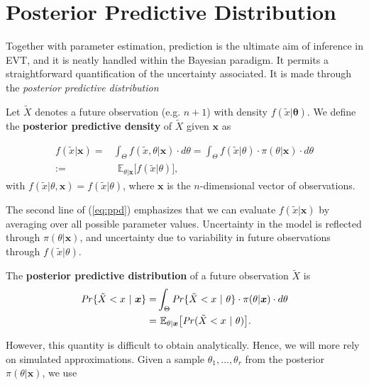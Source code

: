 \section{Posterior Predictive Distribution}\label{sec:ppd}

Together with parameter estimation, prediction is the ultimate aim of inference in EVT, and it is neatly handled within the Bayesian paradigm. It permits a straightforward quantification of the uncertainty associated. It is made through the \emph{posterior predictive distribution}

\begin{definition}
	Let $\tilde{X}$ denotes a future observation (e.g. $n+1$) with density $f(\tilde{x}|\boldsymbol{\theta})$. We define the \textbf{posterior predictive density} of $\tilde{X}$ given $\boldsymbol{x}$ as 
	
	\begin{equation}\label{eq:ppd}
	\begin{aligned}
	f(\tilde{x}|\boldsymbol{x})
	= & \int_{\Theta}f(\tilde{x},\theta | \boldsymbol{x})\cdot d\theta=\int_{\Theta} f(\tilde{x}|\theta)\cdot \pi (\theta|\boldsymbol{x})\cdot d\theta
	\\ := & \ \ \mathbb{E}_{\theta|\boldsymbol{x}}\big[f(\tilde{x}|\theta)\big],
	\end{aligned}
	\end{equation}
	with $f(\tilde{x}|\theta,\boldsymbol{x})=f(\tilde{x}|\theta)$, where $\boldsymbol{x}$ is the $n$-dimensional vector of observations.
\end{definition}
The second line of (\ref{eq:ppd}) emphasizes that we can evaluate $f(\tilde{x}|\boldsymbol{x})$ by averaging over all possible parameter values.
Uncertainty in the model is reflected through $\pi(\theta|\boldsymbol{x})$, and uncertainty due to variability in future observations through $f(\tilde{x}|\theta)$.

\begin{definition}
	The \textbf{posterior predictive distribution} of a future observation $\tilde{X}$ is
	\begin{equation}
	\begin{aligned}
	\text{\emph{Pr}}\{\tilde{X}<x\ | \ \boldsymbol{x}\}= &\int_{\Theta}\text{\emph{Pr}}\{\tilde{X}<x \ | \ \theta \} \cdot \pi(\theta|\boldsymbol{x})\cdot d\theta \\ 
	= & \ \mathbb{E}_{\theta|\boldsymbol{x}}\big[\text{\emph{Pr}}(\tilde{X}<x \ | \ \theta)\big].
	\end{aligned}
	\end{equation}
\end{definition}
However, this quantity is difficult to obtain analytically. Hence, we will more rely on simulated approximations. Given a sample $\theta_1,\dots,\theta_r$ from the posterior $\pi(\theta|\boldsymbol{x})$, we use 

